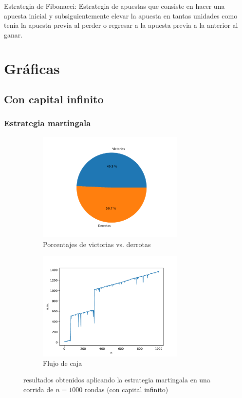 \documentclass{article}
\begin{document}
    Estrategia de Fibonacci: Estrategia de apuestas que consiste en hacer una apuesta inicial y subsiguientemente elevar la apuesta en tantas unidades como tenía la apuesta previa al perder o regresar a la apuesta previa a la anterior al ganar.

\section{Gráficas}
  \subsection{Con capital infinito}
  \subsubsection{Estrategia martingala}
  \begin{figure}[H]
    \centering
    \begin{subfigure}{0.5\textwidth}
      \centering
      \includegraphics[width=0.8\textwidth]{generated/porcentajes-martingala-no acotado.pdf}
      \caption{Porcentajes de victorias vs. derrotas}
    \end{subfigure}%
	\begin{subfigure}{0.5\textwidth}
	  \centering
      \includegraphics[width=0.8\textwidth]{generated/capital-martingala-no acotado.pdf}
	  \caption{Flujo de caja}
	\end{subfigure}
	\caption{resultados obtenidos aplicando la estrategia martingala en una corrida de $n = 1000$ rondas (con capital infinito)}
  \end{figure}
\end{document}
